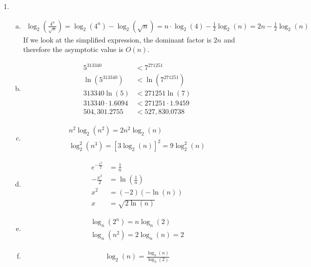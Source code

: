 \documentclass{article}
\begin{document}
\begin{enumerate}[1.]
    \item
    \begin{enumerate}[(a)]
        \item 
        \begin{gather*}
            \log_2\left(\frac{4^n}{\sqrt{n}}\right) = \log_2\left(4^n\right) - \log_2\left(\sqrt{n}\right) = n\cdot\log_2(4) - \frac{1}{2}\log_2(n) = 2n - \frac{1}{2}\log_2(n)
        \end{gather*}
        If we look at the simplified expression, the dominant factor is $2n$ and therefore the asymptotic value is $O(n)$.
        \item 
        \begin{align*}
            5^{313340} &< 7^{271251}\\
            \ln\left(5^{313340}\right) &< \ln\left(7^{271251}\right)\\
            313340\ln\left(5\right) &< 271251\ln\left(7\right)\\
            313340 \cdot 1.6094 &< 271251 \cdot 1.9459\\
            504,301.2755 &< 527,830.0738
        \end{align*}
        \item
        \begin{gather*}
            n^2\log_2\left(n^2\right) = 2n^2\log_2\left(n\right)\\
            \log_2^2\left(n^3\right) = \left[3\log_2\left(n\right)\right]^2 = 9\log_2^2\left(n\right)
        \end{gather*}
        \item 
        \begin{align*}
            e^{-\frac{x^2}{2}} &= \frac{1}{n}\\
            -\frac{x^2}{2} &= \ln\left(\frac{1}{n}\right)\\
            x^2 &= (-2)(-\ln(n))\\
            x &= \sqrt{2\ln(n)} 
        \end{align*}
        \item 
        \begin{gather*}
            \log_n\left(2^n\right) = n\log_n(2)\\
            \log_n\left(n^2\right) = 2\log_n(n) = 2
        \end{gather*}
        \item 
        \begin{gather*}
            \log_2(n) = \frac{\log_3(n)}{\log_3(2)}
        \end{gather*}

\end{enumerate}
\end{enumerate}
\end{document}
